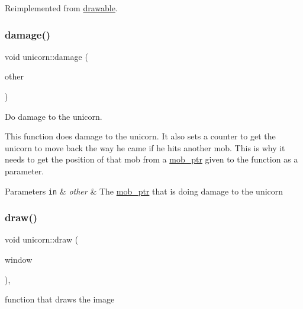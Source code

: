 Reimplemented from \hyperlink{classdrawable_abbc6e0089d502ba48c3fcb9c96e3966e}{drawable}.

\mbox{\label{classunicorn_a8b5a22ab1b26daa540ceb09b5b5747d8}} 
\subsubsection{\texorpdfstring{damage()}{damage()}}
{\footnotesize\ttfamily void unicorn\+::damage (\begin{DoxyParamCaption}\item[{\hyperlink{typedefs_8hpp_a09ee7f853fc9bc830a9445a06fd53d4b}{mob\+\_\+ptr}}]{other }\end{DoxyParamCaption})}



Do damage to the unicorn. 

This function does damage to the unicorn. It also sets a counter to get the unicorn to move back the way he came if he hits another mob. This is why it needs to get the position of that mob from a \hyperlink{typedefs_8hpp_a09ee7f853fc9bc830a9445a06fd53d4b}{mob\+\_\+ptr} given to the function as a parameter.


\begin{DoxyParams}[1]{Parameters}
\mbox{\tt in}  & {\em other} & The \hyperlink{typedefs_8hpp_a09ee7f853fc9bc830a9445a06fd53d4b}{mob\+\_\+ptr} that is doing damage to the unicorn \\
\hline
\end{DoxyParams}
\mbox{\label{classunicorn_a570c34d5669a8d2a61bdc1481e6f9dee}} 
\subsubsection{\texorpdfstring{draw()}{draw()}}
{\footnotesize\ttfamily void unicorn\+::draw (\begin{DoxyParamCaption}\item[{sf\+::\+Render\+Window \&}]{window }\end{DoxyParamCaption})\hspace{0.3cm}{\ttfamily [override]}, {\ttfamily [virtual]}}



function that draws the image 

